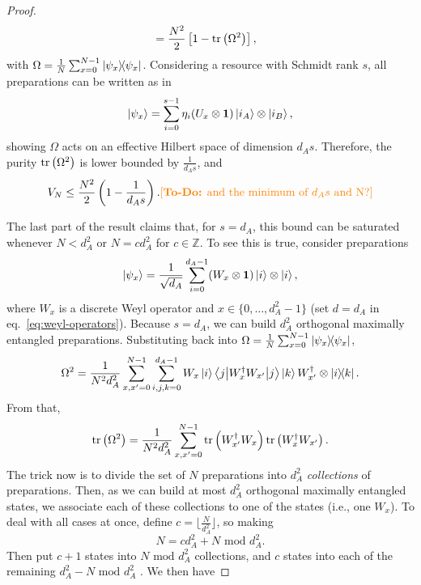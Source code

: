 \begin{proof}
\begin{align*}
            &= \frac{N^2}{2} \left[ 1 - \text{tr}\left( \Omega^2 \right) \right] ,
        \end{align*}
        with $\Omega = \frac{1}{N} \sum_{x=0}^{N-1} \ketbra{\psi_x}{\psi_x}$. Considering a resource with Schmidt rank $s$, all preparations can be written as in
        $$
            \ket{\psi_x} = \sum_{i = 0}^{s - 1} \eta_i (U_x \otimes \mathbf{1}) \ket{i_A} \otimes \ket{i_B} ,
        $$
        showing $\Omega$ acts on an effective Hilbert space of dimension $d_A s$. Therefore, the purity $\text{tr}\left( \Omega^2 \right)$ is lower bounded by $\frac{1}{d_A s}$, and
        $$
            V_N \leq \frac{N^2}{2} \left( 1 - \frac{1}{d_A s} \right) . \text{\textcolor{orange}{[\textbf{To-Do:} and the minimum of $d_A s$ and N?]}}
        $$

        The last part of the result claims that, for $s=d_A$, this bound can be saturated whenever $N < d_A^2$ or $N = c d_A^2$ for $c \in \mathbb{Z}$. To see this is true, consider preparations
        $$
            \ket{\psi_x} = \frac{1}{\sqrt{d_A}} \sum_{i=0}^{d_A - 1} (W_x \otimes \mathbf{1}) \ket{i} \otimes \ket{i} ,
        $$
        where $W_x$ is a discrete Weyl operator and $x \in \{0, \ldots, d_A^2 - 1 \}$ (set $d=d_A$ in eq.~\eqref{eq:weyl-operators}). Because $s=d_A$, we can build $d_A^2$ orthogonal maximally entangled preparations. Substituting back into $\Omega = \frac{1}{N} \sum_{x=0}^{N-1} \ketbra{\psi_x}{\psi_x}$,
        $$
            \Omega^2 = \frac{1}{N^2 d_A^2} \sum_{x, x^\prime = 0}^{N - 1} \sum_{i, j, k = 0}^{d_A - 1} W_x \ket{i} \left\langle j \middle\vert W_x^\dagger W_{x^\prime} \middle\vert j \right\rangle \ket{k} W_{x^\prime}^\dagger \otimes \ketbra{i}{k} .
        $$
        From that,
        $$
            \text{tr}\left( \Omega^2 \right) = \frac{1}{N^2 d_A^2} \sum_{x, x^\prime = 0}^{N-1} \text{tr}\left( W_{x^\prime}^\dagger W_x \right) \text{tr}\left( W_{x}^\dagger W_{x^\prime} \right) .
        $$
        The trick now is to divide the set of $N$ preparations into $d_A^2$ \emph{collections} of preparations. Then, as we can build at most $d_A^2$ orthogonal maximally entangled states, we associate each of these collections to one of the states (i.e., one $W_x$). To deal with all cases at once, define $c = \lfloor \frac{N}{d_A^2} \rfloor$, so making 
        $$
            N = c d_A^2 + N \text{ mod } d_A^2 .
        $$
        Then put $c+1$ states into $N \text{ mod } d_A^2$ collections, and $c$ states into each of the remaining $d_A^2 - N \text{ mod } d_A^2$ . We then have

\end{proof}
